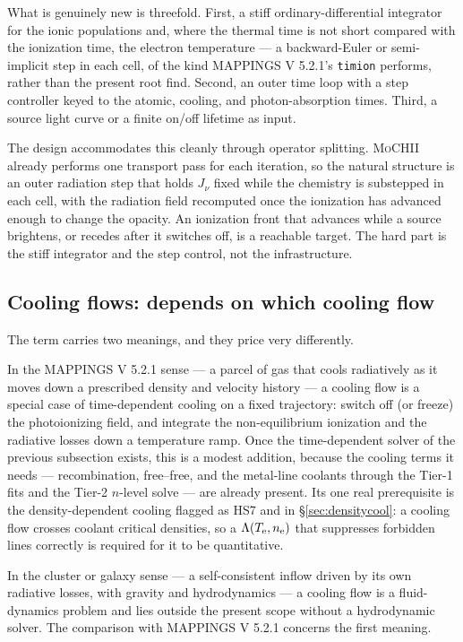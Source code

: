 \documentclass[english,a4paper]{my_memo}
\newcommand{\code}[1]{\texttt{#1}}
\newcommand{\MoCHII}{\textsc{MoCHII}}
\newcommand{\Mappings}{MAPPINGS V 5.2.1}
\newcommand{\Te}{T_{\rm e}}
\newcommand{\nelec}{n_{\rm e}}
\begin{document}
What is genuinely new is threefold.  First, a stiff ordinary-differential
integrator for the ionic populations and, where the thermal time is not
short compared with the ionization time, the electron temperature --- a
backward-Euler or semi-implicit step in each cell, of the kind
\Mappings{}'s \code{timion} performs, rather than the present root find.
Second, an outer time loop with a step controller keyed to the atomic,
cooling, and photon-absorption times.  Third, a source light curve or a
finite on/off lifetime as input.

The design accommodates this cleanly through operator splitting.
\MoCHII{} already performs one transport pass for each iteration, so the
natural structure is an outer radiation step that holds $J_\nu$ fixed
while the chemistry is substepped in each cell, with the radiation field
recomputed once the ionization has advanced enough to change the opacity.
An ionization front that advances while a source brightens, or recedes
after it switches off, is a reachable target.  The hard part is the stiff
integrator and the step control, not the infrastructure.

\subsection{Cooling flows: depends on which cooling flow}

The term carries two meanings, and they price very differently.

In the \Mappings{} sense --- a parcel of gas that cools radiatively as it
moves down a prescribed density and velocity history --- a cooling flow is
a special case of time-dependent cooling on a fixed trajectory: switch off
(or freeze) the photoionizing field, and integrate the non-equilibrium
ionization and the radiative losses down a temperature ramp.  Once the
time-dependent solver of the previous subsection exists, this is a modest
addition, because the cooling terms it needs --- recombination,
free--free, and the metal-line coolants through the Tier-1 fits and the
Tier-2 $n$-level solve --- are already present.  Its one real prerequisite
is the density-dependent cooling flagged as HS7 and in
\S\ref{sec:densitycool}: a cooling flow crosses coolant critical
densities, so a $\Lambda(\Te,\nelec)$ that suppresses forbidden lines
correctly is required for it to be quantitative.

In the cluster or galaxy sense --- a self-consistent inflow driven by its
own radiative losses, with gravity and hydrodynamics --- a cooling flow is
a fluid-dynamics problem and lies outside the present scope without a
hydrodynamic solver.  The comparison with \Mappings{} concerns the first
meaning.
\end{document}

